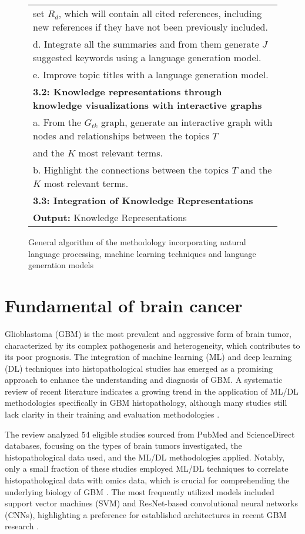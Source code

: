 \documentclass[runningheads]{llncs}
\begin{document}
\begin{figure*}[!h]
{\begin{tabular}{l}
			\quad \quad \quad set $R_d$, which will contain all cited references, including new references if they have not been previously included.\\
			\quad \quad d. Integrate all the summaries and from them generate $J$ suggested keywords using a language generation model.\\
			\quad \quad e. Improve topic titles with a language generation model.\\
			\quad \textbf{3.2: Knowledge representations through knowledge visualizations with interactive graphs}\\
			\quad \quad a. From the $G_{tk}$ graph, generate an interactive graph with nodes and relationships between the topics $T$\\
			\quad \quad and the $K$ most relevant terms.\\
			\quad \quad b. Highlight the connections between the topics $T$ and the $K$ most relevant terms.\\
			\quad \textbf{3.3: Integration of Knowledge Representations}\\
			\hline
			\textbf{Output:} Knowledge Representations \\
			\hline
		\end{tabular}
	}
	\caption{\centering General algorithm of the methodology incorporating natural language processing, machine learning techniques and language generation models}
	\label{tab:Algorithm}
\end{figure*}

\FloatBarrier


\section{Fundamental of brain cancer}
Glioblastoma (GBM) is the most prevalent and aggressive form of brain tumor, characterized by its complex pathogenesis and heterogeneity, which contributes to its poor prognosis. The integration of machine learning (ML) and deep learning (DL) techniques into histopathological studies has emerged as a promising approach to enhance the understanding and diagnosis of GBM. A systematic review of recent literature indicates a growing trend in the application of ML/DL methodologies specifically in GBM histopathology, although many studies still lack clarity in their training and evaluation methodologies \cite{Chun_2025}.

The review analyzed 54 eligible studies sourced from PubMed and ScienceDirect databases, focusing on the types of brain tumors investigated, the histopathological data used, and the ML/DL methodologies applied. Notably, only a small fraction of these studies employed ML/DL techniques to correlate histopathological data with omics data, which is crucial for comprehending the underlying biology of GBM \cite{Chun_2025}. The most frequently utilized models included support vector machines (SVM) and ResNet-based convolutional neural networks (CNNs), highlighting a preference for established architectures in recent GBM research \cite{Chun_2025}.
\end{document}

